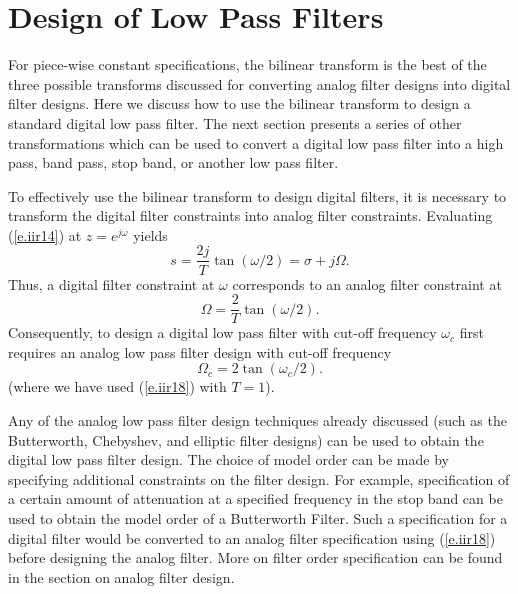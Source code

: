 \section{Design of Low Pass Filters}

	For piece-wise constant specifications,	
the bilinear transform is the best of the 
three possible transforms discussed for converting
analog filter designs into digital filter designs.
Here we discuss how to use the bilinear transform
to design a standard digital low pass filter.  The next
section presents a series of other transformations
which can be used to convert a digital low pass filter into
a high pass, band pass, stop band, or another low pass filter.

	To effectively use the bilinear transform
to design digital filters, it is necessary to transform
the digital filter constraints into analog filter
constraints.  Evaluating (\ref{e.iir14}) at $z=e^{j\omega}$ yields
%
\begin{equation}
s=\frac{2j}{T}\tan(\omega/2)=\sigma+j\Omega.
\label{e.iir17}
\end{equation}
%
Thus, a digital filter constraint at $\omega$ corresponds
to an analog filter constraint at 
%
\begin{equation}
\Omega=\frac{2}{T}\tan(\omega/2).
\label{e.iir18}
\end{equation}
%
Consequently, to design a digital low pass filter with
cut-off frequency $\omega_c$ first requires
an analog low pass filter design with cut-off 
frequency
%
\begin{equation}
\Omega_c=2\tan(\omega_c/2).
\label{e.iir19}
\end{equation}
%
(where we have used (\ref{e.iir18}) with $T=1$).

	Any of the analog low pass filter design techniques
already discussed (such as the Butterworth, Chebyshev,
and elliptic filter designs) can be used to obtain
the digital low pass filter design.  The choice of model order
can be made by specifying additional constraints
on the filter design.  For example, specification of
a certain amount of attenuation at a specified frequency
in the stop band can be used to obtain the model order
of a Butterworth Filter.  Such a specification for
a  digital filter would be converted to an analog filter
specification using (\ref{e.iir18}) before designing the analog
filter.  More on filter order specification can be found in 
the section on analog filter design.
	
